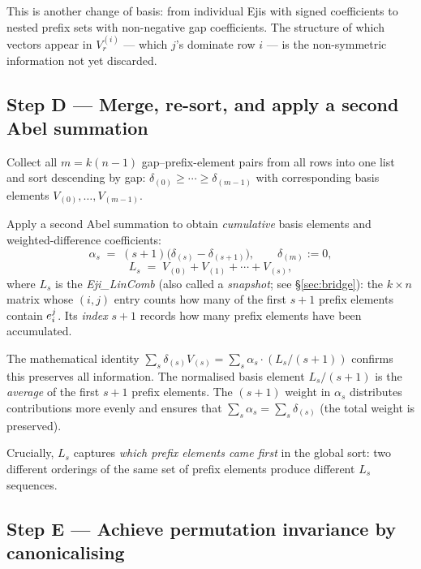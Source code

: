 This is another change of basis: from individual Ejis with signed coefficients
to nested prefix sets with non-negative gap coefficients.  The structure of
which vectors appear in $V^{(i)}_r$ — which $j$'s dominate row $i$ — is the
non-symmetric information not yet discarded.

\subsection*{Step D — Merge, re-sort, and apply a second Abel summation}

Collect all $m = k(n-1)$ gap--prefix-element pairs from all rows into one list
and sort descending by gap: $\delta_{(0)} \ge \cdots \ge \delta_{(m-1)}$ with
corresponding basis elements $V_{(0)},\ldots,V_{(m-1)}$.

Apply a second Abel summation to obtain \emph{cumulative} basis elements and
weighted-difference coefficients:
\[
  \alpha_s \;=\; (s+1)\bigl(\delta_{(s)} - \delta_{(s+1)}\bigr),
  \qquad \delta_{(m)} := 0,
\]
\[
  L_s \;=\; V_{(0)} + V_{(1)} + \cdots + V_{(s)},
\]
where $L_s$ is the \emph{Eji\_LinComb} (also called a \emph{snapshot}; see
\S\ref{sec:bridge}): the $k\times n$ matrix whose $(i,j)$
entry counts how many of the first $s+1$ prefix elements contain $e^{j}_{i}$.
Its \emph{index} $s+1$ records how many prefix elements have been accumulated.

The mathematical identity $\sum_s \delta_{(s)} V_{(s)} = \sum_s \alpha_s
\cdot (L_s/(s+1))$ confirms this preserves all information.  The normalised
basis element $L_s/(s+1)$ is the \emph{average} of the first $s+1$ prefix
elements.  The $(s+1)$ weight in $\alpha_s$ distributes contributions more
evenly and ensures that $\sum_s \alpha_s = \sum_s \delta_{(s)}$ (the total
weight is preserved).

Crucially, $L_s$ captures \emph{which prefix elements came first} in the
global sort: two different orderings of the same set of prefix elements produce
different $L_s$ sequences.

\subsection*{Step E — Achieve permutation invariance by canonicalising}

